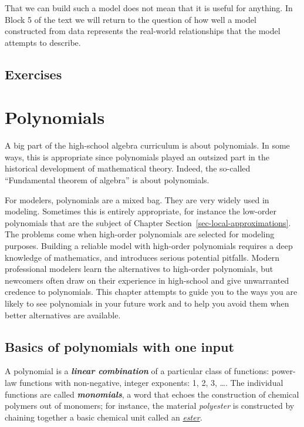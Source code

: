 \documentclass[
  letterpaper,
  DIV=11,
  numbers=noendperiod,
  oneside]{scrreprt}
\begin{document}
That we can build such a model does not mean that it is useful for
anything. In Block 5 of the text we will return to the question of how
well a model constructed from data represents the real-world
relationships that the model attempts to describe.

\hypertarget{exercises-9}{%
\section{Exercises}\label{exercises-9}}

\hypertarget{polynomials}{%
\chapter{Polynomials}\label{polynomials}}

A big part of the high-school algebra curriculum is about polynomials.
In some ways, this is appropriate since polynomials played an outsized
part in the historical development of mathematical theory. Indeed, the
so-called ``Fundamental theorem of algebra'' is about
polynomials.

For modelers, polynomials are a mixed bag. They are very widely used in
modeling. Sometimes this is entirely appropriate, for instance the
low-order polynomials that are the subject of Chapter
Section~\ref{sec-local-approximations}. The problems come when
high-order polynomials are selected for modeling purposes. Building a
reliable model with high-order polynomials requires a deep knowledge of
mathematics, and introduces serious potential pitfalls. Modern
professional modelers learn the alternatives to high-order polynomials,
but newcomers often draw on their experience in high-school and give
unwarranted credence to polynomials. This chapter attempts to guide you
to the ways you are likely to see polynomials in your future work and to
help you avoid them when better alternatives are available.

\hypertarget{sec-polynomial-basics}{%
\section{Basics of polynomials with one
input}\label{sec-polynomial-basics}}

A polynomial is a \textbf{\emph{linear combination}} of a particular
class of functions: power-law functions with non-negative, integer
exponents: 1, 2, 3, \ldots. The individual functions are called
\textbf{\emph{monomials}}, a word that echoes the construction of
chemical polymers out of monomers; for instance, the material
\emph{polyester} is constructed by chaining together a basic chemical
unit called an
\href{https://en.wikipedia.org/wiki/Ester}{\emph{ester}}\emph{.}
\end{document}
